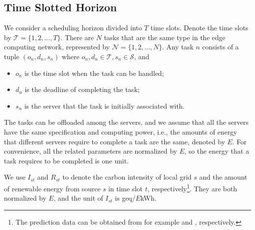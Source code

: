 \documentclass[conference, 10pt, ﬁnal, letterpaper, twocolumn]{IEEEtran}
\begin{document}
\subsection{Time Slotted Horizon}
We consider a scheduling horizon divided into $T$ time slots. Denote the time slots by $\mathcal{T} = \{1,2,...,T\}$. There are $N$ tasks that are the same type in the edge computing network, represented by $\mathcal{N} = \{1, 2, ..., N\}$. Any task $n$ consists of a tuple $(o_n, d_n, s_n)$ where $o_n, d_n \in \mathcal{T}, s_n \in \mathcal{S}$, and
\begin{itemize}
    \item $o_n$ is the time slot when the task can be handled;
    \item $d_n$ is the deadline of completing the task;
    \item $s_n$ is the server that the task is initially associated with.
\end{itemize}
The tasks can be offloaded among the servers, and we assume that all the servers have the same specification and computing power, i.e., the amounts of energy that different servers require to complete a task are the same, denoted by $E$. For convenience, all the related parameters are normalized by $E$, so the energy that a task requires to be completed is one unit.

We use $I_{st}$ and $R_{st}$ to denote the carbon intensity of local grid $s$ and the amount of renewable energy from source $s$ in time slot $t$, respectively\footnote{The prediction data can be obtained from for example \cite{ElectricityMaps} and \cite{li2019renewable}, respectively.}. They are both normalized by $E$, and the unit of $I_{st}$ is geq/$E$kWh.
\end{document}

